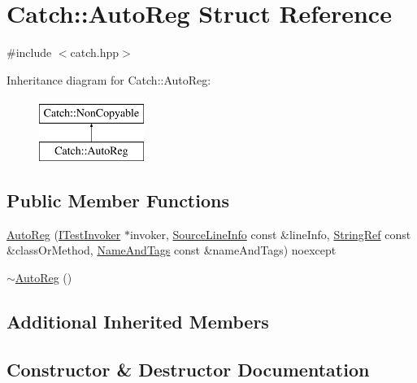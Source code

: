 \hypertarget{struct_catch_1_1_auto_reg}{}\section{Catch\+::Auto\+Reg Struct Reference}
\label{struct_catch_1_1_auto_reg}


{\ttfamily \#include $<$catch.\+hpp$>$}

Inheritance diagram for Catch\+::Auto\+Reg\+:\begin{figure}[H]
\begin{center}
\leavevmode
\includegraphics[height=2.000000cm]{struct_catch_1_1_auto_reg}
\end{center}
\end{figure}
\subsection*{Public Member Functions}
\begin{DoxyCompactItemize}
\item 
\mbox{\hyperlink{struct_catch_1_1_auto_reg_a7eba02fb9d80b9896bf5a6517369af28}{Auto\+Reg}} (\mbox{\hyperlink{struct_catch_1_1_i_test_invoker}{I\+Test\+Invoker}} $\ast$invoker, \mbox{\hyperlink{struct_catch_1_1_source_line_info}{Source\+Line\+Info}} const \&line\+Info, \mbox{\hyperlink{class_catch_1_1_string_ref}{String\+Ref}} const \&class\+Or\+Method, \mbox{\hyperlink{struct_catch_1_1_name_and_tags}{Name\+And\+Tags}} const \&name\+And\+Tags) noexcept
\item 
\mbox{\hyperlink{struct_catch_1_1_auto_reg_a3cdb53f1e5ff115310f3372bebe198f1}{$\sim$\+Auto\+Reg}} ()
\end{DoxyCompactItemize}
\subsection*{Additional Inherited Members}


\subsection{Constructor \& Destructor Documentation}
\mbox{\label{struct_catch_1_1_auto_reg_a7eba02fb9d80b9896bf5a6517369af28}} 
